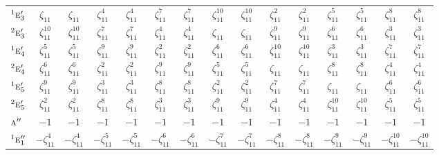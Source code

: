 \documentclass[10pt,a4paper]{article}
\numberwithin{equation}{section}
\newcommand{\irr}[1]{\text{\normalfont\scshape #1}}
\newcommand{\conjpair}[1]{{}^{#1}}
\newcommand{\rootunity}[1]{\zeta_{#1}}
\begin{document}
{\begin{longtable}{@{}lcccccccccccccc@{}}
$\conjpair{1}\irr{e}_{3}'$ & $\rootunity{11}$ & $\rootunity{11}$ & $\rootunity{11}^{4}$ & $\rootunity{11}^{4}$ & $\rootunity{11}^{7}$ & $\rootunity{11}^{7}$ & $\rootunity{11}^{10}$ & $\rootunity{11}^{10}$ & $\rootunity{11}^{2}$ & $\rootunity{11}^{2}$ & $\rootunity{11}^{5}$ & $\rootunity{11}^{5}$ & $\rootunity{11}^{8}$ & $\rootunity{11}^{8}$\\
$\conjpair{2}\irr{e}_{3}'$ & $\rootunity{11}^{10}$ & $\rootunity{11}^{10}$ & $\rootunity{11}^{7}$ & $\rootunity{11}^{7}$ & $\rootunity{11}^{4}$ & $\rootunity{11}^{4}$ & $\rootunity{11}$ & $\rootunity{11}$ & $\rootunity{11}^{9}$ & $\rootunity{11}^{9}$ & $\rootunity{11}^{6}$ & $\rootunity{11}^{6}$ & $\rootunity{11}^{3}$ & $\rootunity{11}^{3}$\\
$\conjpair{1}\irr{e}_{4}'$ & $\rootunity{11}^{5}$ & $\rootunity{11}^{5}$ & $\rootunity{11}^{9}$ & $\rootunity{11}^{9}$ & $\rootunity{11}^{2}$ & $\rootunity{11}^{2}$ & $\rootunity{11}^{6}$ & $\rootunity{11}^{6}$ & $\rootunity{11}^{10}$ & $\rootunity{11}^{10}$ & $\rootunity{11}^{3}$ & $\rootunity{11}^{3}$ & $\rootunity{11}^{7}$ & $\rootunity{11}^{7}$\\
$\conjpair{2}\irr{e}_{4}'$ & $\rootunity{11}^{6}$ & $\rootunity{11}^{6}$ & $\rootunity{11}^{2}$ & $\rootunity{11}^{2}$ & $\rootunity{11}^{9}$ & $\rootunity{11}^{9}$ & $\rootunity{11}^{5}$ & $\rootunity{11}^{5}$ & $\rootunity{11}$ & $\rootunity{11}$ & $\rootunity{11}^{8}$ & $\rootunity{11}^{8}$ & $\rootunity{11}^{4}$ & $\rootunity{11}^{4}$\\
$\conjpair{1}\irr{e}_{5}'$ & $\rootunity{11}^{9}$ & $\rootunity{11}^{9}$ & $\rootunity{11}^{3}$ & $\rootunity{11}^{3}$ & $\rootunity{11}^{8}$ & $\rootunity{11}^{8}$ & $\rootunity{11}^{2}$ & $\rootunity{11}^{2}$ & $\rootunity{11}^{7}$ & $\rootunity{11}^{7}$ & $\rootunity{11}$ & $\rootunity{11}$ & $\rootunity{11}^{6}$ & $\rootunity{11}^{6}$\\
$\conjpair{2}\irr{e}_{5}'$ & $\rootunity{11}^{2}$ & $\rootunity{11}^{2}$ & $\rootunity{11}^{8}$ & $\rootunity{11}^{8}$ & $\rootunity{11}^{3}$ & $\rootunity{11}^{3}$ & $\rootunity{11}^{9}$ & $\rootunity{11}^{9}$ & $\rootunity{11}^{4}$ & $\rootunity{11}^{4}$ & $\rootunity{11}^{10}$ & $\rootunity{11}^{10}$ & $\rootunity{11}^{5}$ & $\rootunity{11}^{5}$\\
$\irr{a}''$ & $-1$ & $-1$ & $-1$ & $-1$ & $-1$ & $-1$ & $-1$ & $-1$ & $-1$ & $-1$ & $-1$ & $-1$ & $-1$ & $-1$\\
$\conjpair{1}\irr{e}_{1}''$ & $-\rootunity{11}^{4}$ & $-\rootunity{11}^{4}$ & $-\rootunity{11}^{5}$ & $-\rootunity{11}^{5}$ & $-\rootunity{11}^{6}$ & $-\rootunity{11}^{6}$ & $-\rootunity{11}^{7}$ & $-\rootunity{11}^{7}$ & $-\rootunity{11}^{8}$ & $-\rootunity{11}^{8}$ & $-\rootunity{11}^{9}$ & $-\rootunity{11}^{9}$ & $-\rootunity{11}^{10}$ & $-\rootunity{11}^{10}$\\

\end{longtable}}
\end{document}
